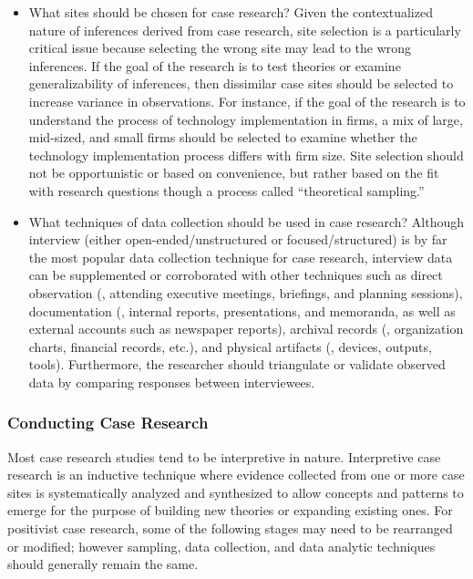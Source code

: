\begin{itemize}
	\item What sites should be chosen for case research? Given the contextualized nature of inferences derived from case research, site selection is a particularly critical issue because selecting the wrong site may lead to the wrong inferences. If the goal of the research is to test theories or examine generalizability of inferences, then dissimilar case sites should be selected to increase variance in observations. For instance, if the goal of the research is to understand the process of technology implementation in firms, a mix of large, mid-sized, and small firms should be selected to examine whether the technology implementation process differs with firm size. Site selection should not be opportunistic or based on convenience, but rather based on the fit with research questions though a process called ``theoretical sampling.''

	\item What techniques of data collection should be used in case research? Although interview (either open-ended/unstructured or focused/structured) is by far the most popular data collection technique for case research, interview data can be supplemented or corroborated with other techniques such as direct observation (\eg, attending executive meetings, briefings, and planning sessions), documentation (\eg, internal reports, presentations, and memoranda, as well as external accounts such as newspaper reports), archival records (\eg, organization charts, financial records, etc.), and physical artifacts (\eg, devices, outputs, tools). Furthermore, the researcher should triangulate or validate observed data by comparing responses between interviewees.
\end{itemize}

\subsubsection{Conducting Case Research}

Most case research studies tend to be interpretive in nature. Interpretive case research is an inductive technique where evidence collected from one or more case sites is systematically analyzed and synthesized to allow concepts and patterns to emerge for the purpose of building new theories or expanding existing ones. For positivist case research, some of the following stages may need to be rearranged or modified; however sampling, data collection, and data analytic techniques should generally remain the same.


